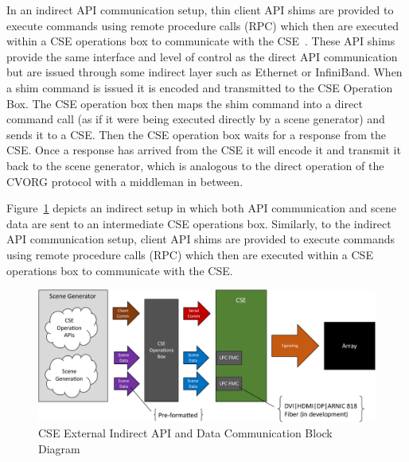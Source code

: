         In an indirect API communication setup, thin client API shims are provided to execute commands using remote procedure calls (RPC) which then are executed within a CSE operations box to communicate with the CSE~\cite{CampbellEtAl2019}. These API shims provide the same interface and level of control as the direct API communication but are issued through some indirect layer such as Ethernet or InfiniBand. When a shim command is issued it is encoded and transmitted to the CSE Operation Box. The CSE operation box then maps the shim command into a direct command call (as if it were being executed directly by a scene generator) and sends it to a CSE. Then the CSE operation box waits for a response from the CSE. Once a response has arrived from the CSE it will encode it and transmit it back to the scene generator, which is analogous to the direct operation of the CVORG protocol with a middleman in between.

        Figure~\ref{fig:external_cse_comm_indirect} depicts an indirect setup in which both API communication and scene data are sent to an intermediate CSE operations box. Similarly, to the indirect API communication setup, client API shims are provided to execute commands using remote procedure calls (RPC) which then are executed within a CSE operations box to communicate with the CSE.

        \begin{figure}
            \centering
            \includegraphics[width=1.0\textwidth]{fig/external_cse_comm_indirect.pdf}
            \caption{CSE External Indirect API and Data Communication Block Diagram}
            \label{fig:external_cse_comm_indirect}
        \end{figure}

